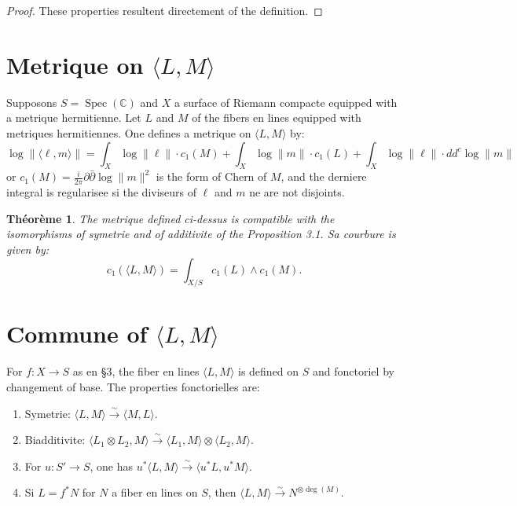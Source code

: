 \documentclass[11pt,a4paper]{article}
\theoremstyle{plain}
\newtheorem{theorem}{Th\'eor\`eme}[section]
\theoremstyle{definition}
\DeclareMathOperator{\Spec}{Spec}
\newcommand{\C}{\mathbb{C}}
\begin{document}
\begin{proof}
These properties resultent directement of the definition.
\end{proof}

\section{Metrique on $\langle L, M \rangle$}

Supposons $S = \Spec(\C)$ and $X$ a surface of Riemann compacte equipped with a metrique hermitienne. Let $L$ and $M$ of the fibers en lines equipped with metriques hermitiennes. One defines a metrique on $\langle L, M \rangle$ by:
\begin{equation}
\log \|\langle \ell, m \rangle\| = \int_X \log \|\ell\| \cdot c_1(M) + \int_X \log \|m\| \cdot c_1(L) + \int_X \log \|\ell\| \cdot dd^c \log \|m\|
\end{equation}
or $c_1(M) = \frac{i}{2\pi} \partial \bar{\partial} \log \|m\|^2$ is the form of Chern of $M$, and the derniere integral is regularisee si the diviseurs of $\ell$ and $m$ ne are not disjoints.

\begin{theorem}
The metrique defined ci-dessus is compatible with the isomorphisms of symetrie and of additivite of the Proposition 3.1. Sa courbure is given by:
\begin{equation}
c_1(\langle L, M \rangle) = \int_{X/S} c_1(L) \wedge c_1(M).
\end{equation}
\end{theorem}

\section{Commune of $\langle L, M \rangle$}

For $f: X \to S$ as en \S3, the fiber en lines $\langle L, M \rangle$ is defined on $S$ and fonctoriel by changement of base. The properties fonctorielles are:
\begin{enumerate}
\item[(i)] Symetrie: $\langle L, M \rangle \xrightarrow{\sim} \langle M, L \rangle$.
\item[(ii)] Biadditivite: $\langle L_1 \otimes L_2, M \rangle \xrightarrow{\sim} \langle L_1, M \rangle \otimes \langle L_2, M \rangle$.
\item[(iii)] For $u: S' \to S$, one has $u^* \langle L, M \rangle \xrightarrow{\sim} \langle u^* L, u^* M \rangle$.
\item[(iv)] Si $L = f^* N$ for $N$ a fiber en lines on $S$, then $\langle L, M \rangle \xrightarrow{\sim} N^{\otimes \deg(M)}$.
\end{enumerate}
\end{document}
